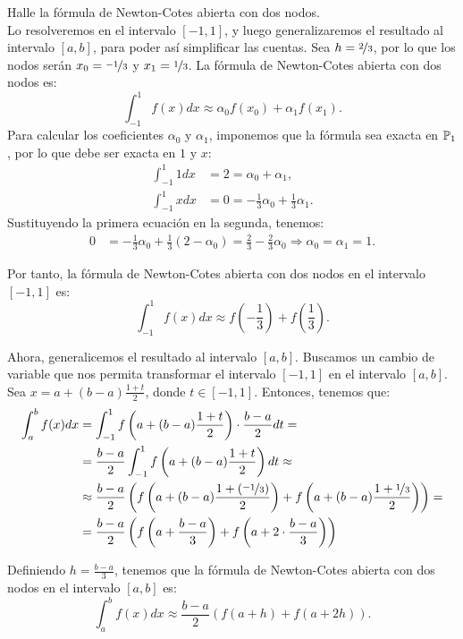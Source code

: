 \begin{ejercicio}\label{ej:2.1.13}
    Halle la fórmula de Newton-Cotes abierta con dos nodos.\\

    Lo resolveremos en el intervalo $[-1, 1]$, y luego generalizaremos el resultado al intervalo $[a, b]$, para poder así simplificar las cuentas. Sea $h=\nicefrac{2}{3}$, por lo que los nodos serán $x_0 = \nicefrac{-1}{3}$ y $x_1 = \nicefrac{1}{3}$. La fórmula de Newton-Cotes abierta con dos nodos es:
    \begin{equation*}
        \int_{-1}^{1} f(x) dx \approx \alpha_0 f(x_0) + \alpha_1 f(x_1).
    \end{equation*}
    Para calcular los coeficientes $\alpha_0$ y $\alpha_1$, imponemos que la fórmula sea exacta en $\mathbb{P}_1$, por lo que debe ser exacta en $1$ y $x$:
    \begin{align*}
        \int_{-1}^{1} 1 dx &= 2 = \alpha_0 + \alpha_1,\\
        \int_{-1}^{1} x dx &= 0 = -\frac{1}{3}\alpha_0 + \frac{1}{3}\alpha_1.
    \end{align*}
    Sustituyendo la primera ecuación en la segunda, tenemos:
    \begin{align*}
        0 &= -\frac{1}{3}\alpha_0 + \frac{1}{3}(2 - \alpha_0) = \frac{2}{3} - \frac{2}{3}\alpha_0
        \Longrightarrow \alpha_0 = \alpha_1 = 1.
    \end{align*}

    Por tanto, la fórmula de Newton-Cotes abierta con dos nodos en el intervalo $[-1, 1]$ es:
    \begin{equation*}
        \int_{-1}^{1} f(x) dx \approx f\left(-\frac{1}{3}\right) + f\left(\frac{1}{3}\right).
    \end{equation*}

    Ahora, generalicemos el resultado al intervalo $[a, b]$. Buscamos un cambio de variable que nos permita transformar el intervalo $[-1,1]$ en el intervalo $[a,b]$. Sea $x=a+(b-a)\frac{1+t}{2}$, donde $t\in[-1,1]$. Entonces, tenemos que:
    \begin{align*}
        \int_{a}^{b} f(x) dx &= \int_{-1}^{1} f\left(a+(b-a)\frac{1+t}{2}\right)\cdot \frac{b-a}{2} dt
        =\\&= \frac{b-a}{2} \int_{-1}^{1} f\left(a+(b-a)\frac{1+t}{2}\right) dt
        \approx\\&\approx \frac{b-a}{2} \left( f\left(a+(b-a)\frac{1+(\nicefrac{-1}{3})}{2}\right) + f\left(a+(b-a)\frac{1+\nicefrac{1}{3}}{2}\right) \right)
        =\\&= \frac{b-a}{2} \left( f\left(a+\frac{b-a}{3}\right) + f\left(a+2\cdot \frac{b-a}{3}\right) \right)
    \end{align*}

    Definiendo $h = \frac{b-a}{3}$, tenemos que la fórmula de Newton-Cotes abierta con dos nodos en el intervalo $[a, b]$ es:
    \begin{equation*}
        \int_{a}^{b} f(x) dx \approx \frac{b-a}{2} \left( f\left(a+h\right) + f\left(a+2h\right) \right).
    \end{equation*}
\end{ejercicio}

